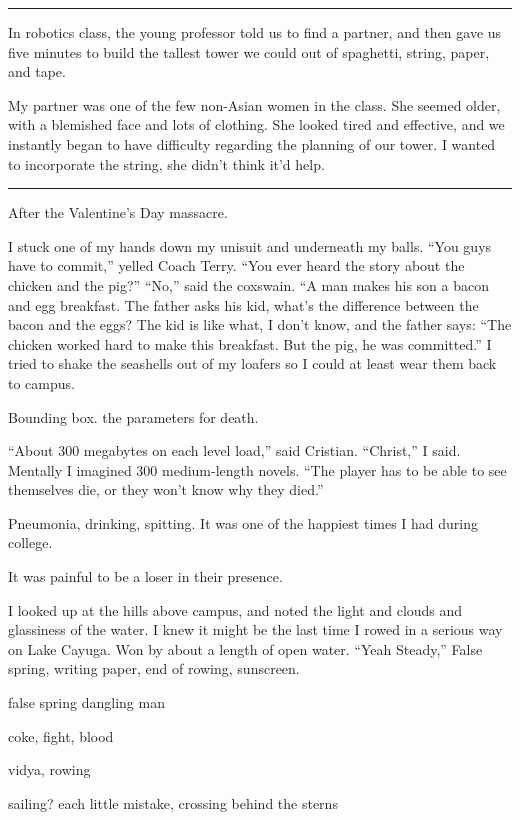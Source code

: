 \plainfancybreak{12pt}{2}{* * *}

In robotics class, the young professor told us to find a partner, and then gave
us five minutes to build the tallest tower we could out of spaghetti, string,
paper, and tape.

My partner was one of the few non-Asian women in the class.  She seemed older,
with a blemished face and lots of clothing.  She looked tired and effective, and
we instantly began to have difficulty regarding the planning of our tower.  I
wanted to incorporate the string, she didn't think it'd help.

\plainfancybreak{12pt}{2}{* * *}

After the Valentine's Day massacre.

I stuck one of my hands down my unisuit and underneath my balls.  ``You guys
have to commit,'' yelled Coach Terry.  ``You ever heard the story about the
chicken and the pig?'' ``No,'' said the coxswain.  ``A man makes his son a bacon
and egg breakfast.  The father asks his kid, what's the difference between the
bacon and the eggs?  The kid is like what, I don't know, and the father says:
``The chicken worked hard to make this breakfast.  But the pig, he was
committed.'' I tried to shake the seashells out of my loafers so I could at
least wear them back to campus. 

Bounding box.  the parameters for death.

``About 300 megabytes on each level load,'' said Cristian.  ``Christ,'' I said.
Mentally I imagined 300 medium-length novels.  ``The player has to be able to
see themselves die, or they won't know why they died.'' 

Pneumonia, drinking, spitting.  It was one of the happiest times I had during college.

It was painful to be a loser in their presence.  

I looked up at the hills above campus, and noted the light and clouds and
glassiness of the water.  I knew it might be the last time I rowed in a serious
way on Lake Cayuga.  Won by about a length of open water.  ``Yeah Steady,'' False
spring, writing paper, end of rowing, sunscreen.

false spring
dangling man

coke, fight, blood

vidya, rowing

sailing?  each little mistake, crossing behind the sterns
